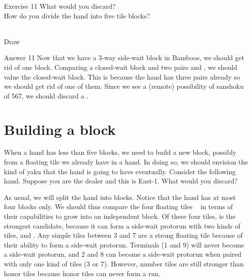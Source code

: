 \vfill

\begin{itembox}[l]{Exercise 11}
What would you discard? \\
\vsp
How do you divide the hand into five tile blocks? 

\bp
{}~\\
\hspace{290pt}\footnotesize{Draw}
\ep
\end{itembox}

\newpage


\begin{itembox}[r]{Answer 11}
\emj
Now that we have a 3-way side-wait block in Bamboos, we should get rid of one block. Comparing a closed-wait block {\large{}} and two pairs {\large{}} and {\large{}}, we should value the closed-wait block. This is because the hand has three pairs already so we should get rid of one of them. Since we see a (remote) possibility of {\jap sanshoku} of 567, we should discard a {\large{}}. 
\end{itembox}


\section{Building a block}

When a hand has less than five blocks, we need to build a new block, possibly from a floating tile we already have in a hand. In doing so, we should envision the kind of {\jap yaku} that the hand is going to have eventually. Consider the following hand. Suppose you are the dealer and this is East-1. What would you discard?

\bp
{}\zhong\bei
\ep

As usual, we will split the hand into blocks. Notice that the hand has at most four blocks only. 
\emj \label{hand:head}
We should thus compare the four floating tiles {\large{}  \zhong ~\bei} in terms of their capabilities to grow into an independent block. Of these four tiles, {\large{}} is the strongest candidate, because it can form a side-wait protorun with two kinds of tiles,  and . Any simple tiles between 3 and 7 are a strong floating tile because of their ability to form a side-wait protorun. Terminals (1 and 9) will never become a side-wait protorun, and 2 and 8 can become a side-wait protorun when paired with only one kind of tiles (3 or 7). However, number tiles are still stronger than honor tiles because honor tiles can never form a run. 

